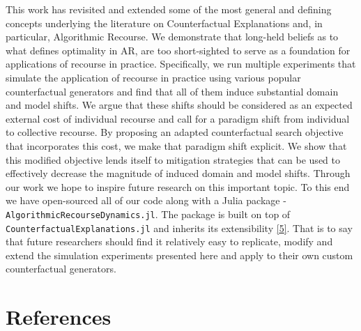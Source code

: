 \documentclass[
  conference]{IEEEtran}
\begin{document}
This work has revisited and extended some of the most general and
defining concepts underlying the literature on Counterfactual
Explanations and, in particular, Algorithmic Recourse. We demonstrate
that long-held beliefs as to what defines optimality in AR, are too
short-sighted to serve as a foundation for applications of recourse in
practice. Specifically, we run multiple experiments that simulate the
application of recourse in practice using various popular counterfactual
generators and find that all of them induce substantial domain and model
shifts. We argue that these shifts should be considered as an expected
external cost of individual recourse and call for a paradigm shift from
individual to collective recourse. By proposing an adapted
counterfactual search objective that incorporates this cost, we make
that paradigm shift explicit. We show that this modified objective lends
itself to mitigation strategies that can be used to effectively decrease
the magnitude of induced domain and model shifts. Through our work we
hope to inspire future research on this important topic. To this end we
have open-sourced all of our code along with a Julia package -
\texttt{AlgorithmicRecourseDynamics.jl}. The package is built on top of
\texttt{CounterfactualExplanations.jl} and inherits its extensibility
\protect\hyperlink{ref-altmeyer2022CounterfactualExplanations}{{[}5{]}}.
That is to say that future researchers should find it relatively easy to
replicate, modify and extend the simulation experiments presented here
and apply to their own custom counterfactual generators.

\hypertarget{references}{%
\section*{References}\label{references}}
\end{document}

